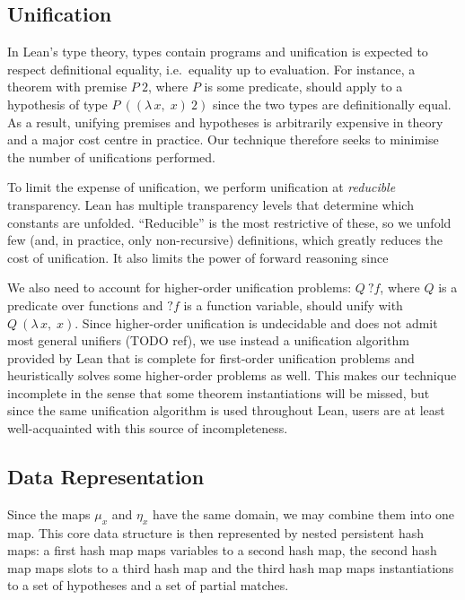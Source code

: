 \documentclass[runningheads]{llncs}
\newcommand{\Lam}[2]{\ensuremath{\lambda\, #1,\; #2}}
\newcommand{\mvar}[1]{\ensuremath{?#1}}
\begin{document}
\subsection{Unification}%
\label{sec:unification}

In Lean's type theory, types contain programs and unification is expected to respect definitional equality, i.e.\ equality up to evaluation.
For instance, a theorem with premise $P~2$, where $P$ is some predicate, should apply to a hypothesis of type $P~((\Lam{x}{x})~2)$ since the two types are definitionally equal.
As a result, unifying premises and hypotheses is arbitrarily expensive in theory and a major cost centre in practice.
Our technique therefore seeks to minimise the number of unifications performed.

To limit the expense of unification, we perform unification at \emph{reducible} transparency.
Lean has multiple transparency levels that determine which constants are unfolded.
\enquote{Reducible} is the most restrictive of these, so we unfold few (and, in practice, only non-recursive) definitions, which greatly reduces the cost of unification.
It also limits the power of forward reasoning since

We also need to account for higher-order unification problems: $Q~\mvar{f}$, where $Q$ is a predicate over functions and $\mvar{f}$ is a function variable, should unify with $Q~(\Lam{x}{x})$.
Since higher-order unification is undecidable and does not admit most general unifiers (TODO ref), we use instead a unification algorithm provided by Lean that is complete for first-order unification problems and heuristically solves some higher-order problems as well.
This makes our technique incomplete in the sense that some theorem instantiations will be missed, but since the same unification algorithm is used throughout Lean, users are at least well-acquainted with this source of incompleteness.

\subsection{Data Representation}

Since the maps $μ_{x}$  and $η_{x}$ have the same domain, we may combine them into one map.
This core data structure is then represented by nested persistent hash maps: a first hash map maps variables to a second hash map, the second hash map maps slots to a third hash map and the third hash map maps instantiations to a set of hypotheses and a set of partial matches.
\end{document}
